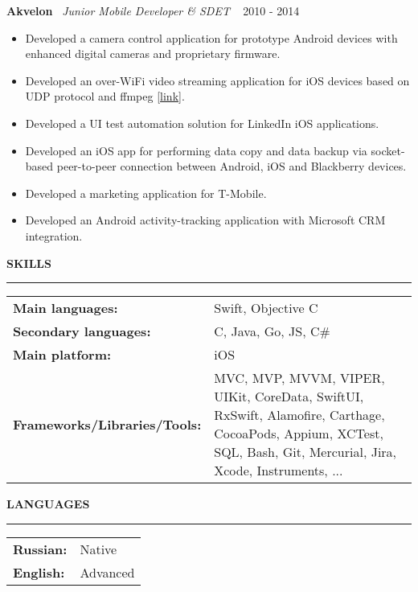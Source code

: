 ﻿\documentclass{article}
\newcommand{\cvsection}[1]{
  \vspace{2.6ex}
  \noindent\textbf{\large{\uppercase{#1}}}
  \vspace{1ex}
  \hrule
  \vspace{1.5ex}
}
\newcommand{\cvparagraph}[3]{
  \noindent\indent
  \textbf{#1}
  \ 
  \textit{#2}
  \ 
  \hfill{}
  {#3}\vspace{1ex}}
\newcommand{\cvtable}[1]{
  {\renewcommand{\arraystretch}{1.2}
    \begin{tabular}{p{\dimexpr.4\textwidth-1\parindent}p{\dimexpr.6\textwidth}}
      #1
    \end{tabular}}
}
\newcommand{\cvlist}[1]{
  \begin{itemize}[topsep=0ex,leftmargin=*,itemsep=0ex,parsep=1ex,labelwidth=\parindent]
    #1
  \end{itemize}
}
\begin{document}
\cvparagraph{Akvelon}{Junior Mobile Developer \& SDET}{2010 - 2014}
\cvlist{
  \item Developed a camera control application for prototype Android devices with enhanced digital cameras and proprietary firmware.
  \item Developed an over-WiFi video streaming application for iOS devices based on UDP protocol and ffmpeg [\href{http://neuronbeta.com/chirpglobal/chirpvision/app/}{link}].
  \item Developed a UI test automation solution for LinkedIn iOS applications.
  \item Developed an iOS app for performing data copy and data backup via socket-based peer-to-peer connection between Android, iOS and Blackberry devices.
  \item Developed a marketing application for T-Mobile.
  \item Developed an Android activity-tracking application with Microsoft CRM integration.
}

\cvsection{Skills}
\cvtable{
  \textbf{Main languages:} & Swift, Objective C \\
  \textbf{Secondary languages:} & C, Java, Go, JS, C\# \\
  \textbf{Main platform:} & iOS \\
  \textbf{Frameworks/Libraries/Tools:} & MVC, MVP, MVVM, VIPER, UIKit, CoreData, SwiftUI, RxSwift, Alamofire, Carthage, CocoaPods, Appium, XCTest, SQL, Bash, Git, Mercurial, Jira, Xcode, Instruments, ...
}

\cvsection{Languages}
\cvtable{
  \textbf{Russian:} & Native \\
  \textbf{English:} & Advanced \\
}
\end{document}
